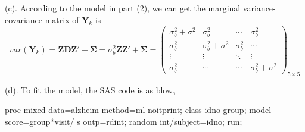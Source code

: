 \documentclass[letterpaper, 12pt]{article}
\newcommand{\lma}{\left(\begin{matrix}}
\newcommand{\rma}{\end{matrix}\right)}
\begin{document}
(c). According to the model in part (2), we can get the marginal variance-covariance matrix of $\bm{Y}_k$ is 
$$
var(\bm{Y}_k)=\bm{ZDZ}'+\bm{\Sigma}=\sigma_b^2\bm{ZZ}'+\bm{\Sigma}=\lma
\sigma^2_b+\sigma^2&\sigma^2_b&\cdots&\sigma^2_b\\
\sigma^2_b&\sigma^2_b+\sigma^2&\sigma^2_b&\cdots\\
\vdots&\vdots&\ddots&\vdots\\
\sigma^2_b&\cdots&\cdots&\sigma^2_b+\sigma^2\rma_{5\times 5}
$$


(d). To fit the model, the SAS code is as blow,
\begin{Sascode}[store=class]
proc mixed data=alzheim method=ml noitprint;
class idno group;
model score=group*visit/ s outp=rdint;
random int/subject=idno;
run;
\end{Sascode}
\end{document}
